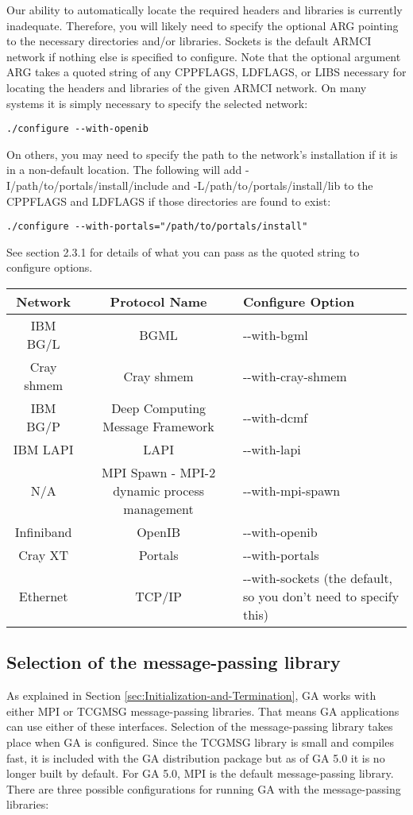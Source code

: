 Our ability to automatically locate the required headers and libraries is
currently inadequate. Therefore, you will likely need to specify the optional
ARG pointing to the necessary directories and/or libraries.  Sockets is the
default ARMCI network if nothing else is specified to configure. Note that the
optional argument ARG takes a quoted string of any CPPFLAGS, LDFLAGS, or LIBS
necessary for locating the headers and libraries of the given ARMCI network. On
many systems it is simply necessary to specify the selected network: 
\begin{verbatim}
./configure --with-openib 
\end{verbatim}
On others, you may need to specify the path to the network's installation if it
is in a non-default location. The following will add
-I/path/to/portals/install/include and -L/path/to/portals/install/lib to the
CPPFLAGS and LDFLAGS if those directories are found to exist: 
\begin{verbatim}
./configure --with-portals="/path/to/portals/install"
\end{verbatim}
See section 2.3.1 for details of what you can pass as the quoted string to
configure options. 

\begin{tabular}{|c|c|>{\centering}p{3cm}|}
\hline 
Network & Protocol Name & Configure Option\tabularnewline
\hline
\hline 
IBM BG/L & BGML & -{}-with-bgml\tabularnewline
\hline 
Cray shmem & Cray shmem & -{}-with-cray-shmem\tabularnewline
\hline 
IBM BG/P & Deep Computing Message Framework & -{}-with-dcmf\tabularnewline
\hline 
IBM LAPI & LAPI & -{}-with-lapi\tabularnewline
\hline 
N/A & MPI Spawn - MPI-2 dynamic process management & -{}-with-mpi-spawn\tabularnewline
\hline 
Infiniband & OpenIB & -{}-with-openib\tabularnewline
\hline 
Cray XT & Portals & -{}-with-portals\tabularnewline
\hline 
Ethernet & TCP/IP & -{}-with-sockets (the default, so you don't need to specify this)\tabularnewline
\hline
\end{tabular}

\subsection{Selection of the message-passing library}
\label{sec:selection-of-the-message-passing-library}

As explained in Section \ref{sec:Initialization-and-Termination}, GA works with
either MPI or TCGMSG message-passing libraries. That means GA applications can
use either of these interfaces. Selection of the message-passing library takes
place when GA is configured.  Since the TCGMSG library is small and compiles
fast, it is included with the GA distribution package but as of GA 5.0 it is no
longer built by default. For GA 5.0, MPI is the default message-passing
library.  There are three possible configurations for running GA with the
message-passing libraries:

